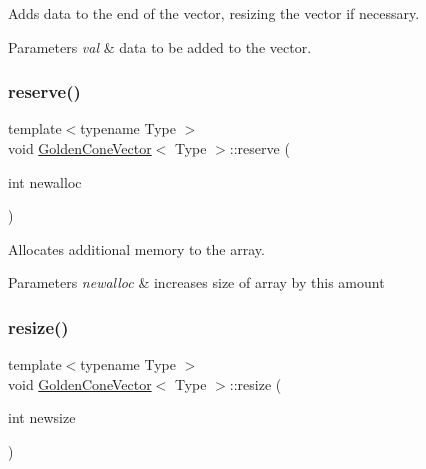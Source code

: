 Adds data to the end of the vector, resizing the vector if necessary. 


\begin{DoxyParams}{Parameters}
{\em val} & data to be added to the vector. \\
\hline
\end{DoxyParams}
\mbox{\label{class_golden_cone_vector_aae3c2e2056f3c7d3abfe27fc2fcdfd78}} 
\subsubsection{\texorpdfstring{reserve()}{reserve()}}
{\footnotesize\ttfamily template$<$typename Type $>$ \\
void \mbox{\hyperlink{class_golden_cone_vector}{Golden\+Cone\+Vector}}$<$ Type $>$\+::reserve (\begin{DoxyParamCaption}\item[{int}]{newalloc }\end{DoxyParamCaption})}



Allocates additional memory to the array. 


\begin{DoxyParams}{Parameters}
{\em newalloc} & increases size of array by this amount \\
\hline
\end{DoxyParams}
\mbox{\label{class_golden_cone_vector_a89a420c701f5439a9b418daaede53081}} 
\subsubsection{\texorpdfstring{resize()}{resize()}}
{\footnotesize\ttfamily template$<$typename Type $>$ \\
void \mbox{\hyperlink{class_golden_cone_vector}{Golden\+Cone\+Vector}}$<$ Type $>$\+::resize (\begin{DoxyParamCaption}\item[{int}]{newsize }\end{DoxyParamCaption})}



